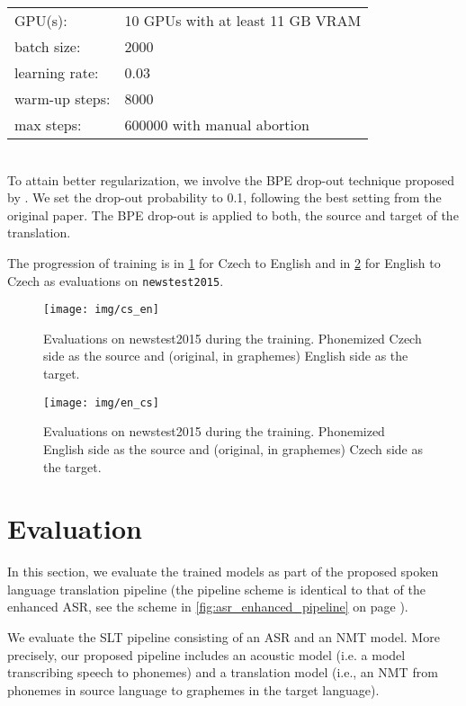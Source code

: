 \begin{tabular}{ll}
	 GPU(s): & 10 GPUs with at least 11 GB VRAM \\
	 batch size:& 2000\\
	 learning rate:& 0.03\\
	 warm-up steps:& 8000\\
	 max steps:& 600000 with manual abortion\\
\end{tabular}\\

To attain better regularization, we involve the BPE drop-out technique proposed by . We set the drop-out probability to 0.1, following the best setting from the original paper. The BPE drop-out is applied to both, the source and target of the translation.

The progression of training is in \cref{fig:cs_en} for Czech to English and in \cref{fig:en_cs} for English to Czech as evaluations on \texttt{newstest2015}.

\begin{figure}[h]
	\texttt{[image: img/cs\_en]}
	\caption[Czech to English training]{Evaluations on newstest2015 during the training. Phonemized Czech side as the source and (original, in graphemes) English side as the target.}
	\label{fig:cs_en}
\end{figure}

\begin{figure}[h]
	\texttt{[image: img/en\_cs]}
	\caption[English to Czech training]{Evaluations on newstest2015 during the training. Phonemized English side as the source and (original, in graphemes) Czech side as the target.}
	\label{fig:en_cs}
\end{figure}

\section{Evaluation}
\label{slt:evaluation}
In this section, we evaluate the trained models as part of the proposed spoken language translation pipeline (the pipeline scheme is identical to that of the enhanced ASR, see the scheme in \cref{fig:asr_enhanced_pipeline} on page \pageref{fig:asr_enhanced_pipeline}).

We evaluate the SLT pipeline consisting of an ASR and an NMT model. More precisely, our proposed pipeline includes an acoustic model (i.e. a model transcribing speech to phonemes) and a translation model (i.e., an NMT from phonemes in source language to graphemes in the target language). 

